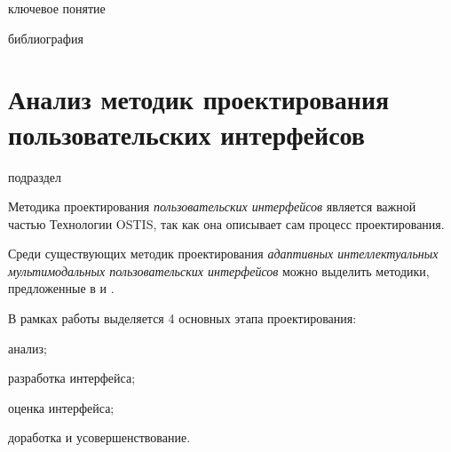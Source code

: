 \begin{SCn}
\begin{scnrelfromlist}{ключевое понятие}
\end{scnrelfromlist}
\bigskip

\begin{scnrelfromlist}{библиография}
\end{scnrelfromlist}

\end{SCn}

\section{Анализ методик проектирования пользовательских интерфейсов}
\label{sec_analysis_UI_design_methodologies}

\begin{SCn}
	\begin{scnrelfromlist}{подраздел}
	\end{scnrelfromlist}
\end{SCn}

Методика проектирования \textit{пользовательских интерфейсов} является важной частью Технологии OSTIS, так как она описывает сам процесс проектирования.

Среди существующих методик проектирования \textit{адаптивных интеллектуальных мультимодальных пользовательских интерфейсов} можно выделить методики,
предложенные в  и  .

В рамках работы  выделяется 4 основных этапа проектирования:
\begin{textitemize}
    \item анализ;
    \item разработка интерфейса;
    \item оценка интерфейса;
    \item доработка и усовершенствование.
\end{textitemize}

